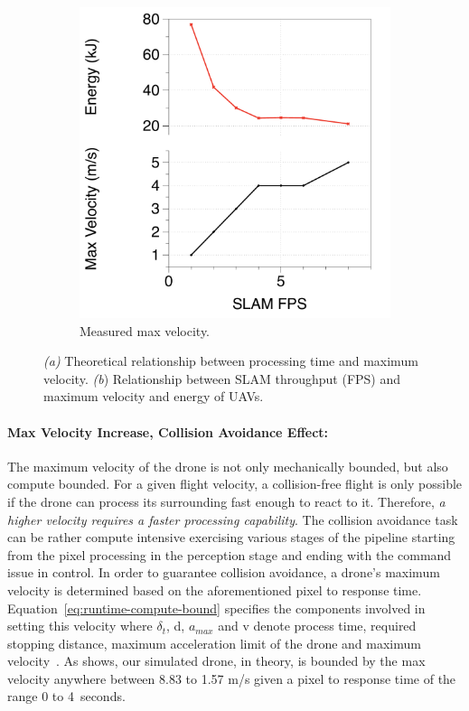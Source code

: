 \begin{figure}[t!]
\begin{subfigure}{.49\columnwidth}
   \includegraphics[trim=0 0 0 0, clip, width=1.0\columnwidth]{figs/slam_fps_velocity_energy}
    \caption{Measured max velocity.}
    \label{fig:slam-velocity-energy}
    \end{subfigure}
\vspace{-5pt}
\caption{\emph{(a)} Theoretical relationship between processing time and maximum velocity. \emph{(b}) Relationship between SLAM throughput (FPS) and maximum velocity and energy of UAVs.}
\end{figure}

\paragraph{Max Velocity Increase, Collision Avoidance Effect:} The maximum velocity of the drone is not only mechanically bounded, but also compute bounded. For a given flight velocity, a collision-free flight is only possible if the drone can process its surrounding fast enough to react to it. Therefore, \emph{a higher velocity requires a faster processing capability}. The collision avoidance task can be rather compute intensive exercising various stages of the pipeline starting from the pixel processing in the perception stage and ending with the command issue in control. In order to guarantee collision avoidance, a  drone's maximum velocity is determined based on the aforementioned pixel to response time. Equation~\ref{eq:runtime-compute-bound} specifies the components involved in setting this velocity where $\delta_{t}$, d, $a_{max}$ and v denote process time, required stopping distance, maximum acceleration limit of the drone and maximum velocity~\cite{high-speed-nav}. As  shows, our simulated drone, in theory, is bounded by the max velocity anywhere between 8.83 to 1.57 m/s given a pixel to response time of the range 0 to 4~seconds. 

